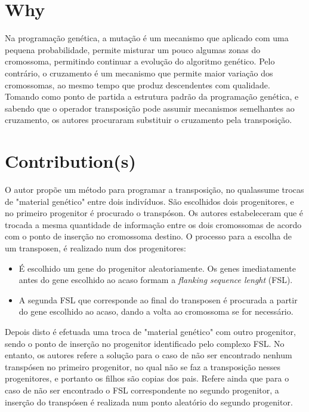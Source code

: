 \documentclass[11pt,portuguese,a4paper]{article}
\begin{document}
\section{Why}

Na programação genética, a mutação é um mecanismo que aplicado com uma pequena probabilidade, permite misturar um pouco algumas zonas do cromossoma, permitindo continuar a evolução do algoritmo genético. Pelo contrário, o cruzamento é um mecanismo que permite maior variação dos cromossomas, ao mesmo tempo que produz descendentes com qualidade.  Tomando como ponto de partida a estrutura padrão da programação genética, e sabendo que o operador transposição pode assumir mecanismos semelhantes ao cruzamento, os autores procuraram substituir o cruzamento pela transposição.

\section{Contribution(s)}

O autor propõe um método para programar a transposição, no qualassume trocas de "material genético" entre dois indivíduos.
São escolhidos dois progenitores, e no primeiro progenitor é procurado o transpóson.
Os autores estabeleceram que é trocada a mesma quantidade de informação entre os dois cromossomas de acordo com o ponto de inserção no cromossoma destino.
O processo para a escolha de um transposen, é realizado num dos progenitores:
\begin{itemize}
    \item É escolhido um gene do progenitor aleatoriamente. Os genes imediatamente antes do gene escolhido ao acaso formam a \textit{flanking sequence lenght} (FSL).
    \item A segunda FSL que corresponde ao final do transposen é procurada a partir do gene escolhido ao acaso, dando a volta ao cromossoma se for necessário.
\end{itemize}
Depois disto é efetuada uma troca de "material genético" com outro progenitor, sendo o ponto de inserção no progenitor identificado pelo complexo FSL.
No entanto, os autores refere a solução para o caso de não ser encontrado nenhum transpósen no primeiro progenitor, no qual não se faz a transposição nesses progenitores, e portanto os filhos são copias dos pais. Refere ainda que para o caso de não ser encontrado o FSL correspondente no segundo progenitor, a inserção do transpósen é realizada num ponto aleatório do segundo progenitor.
\end{document}
